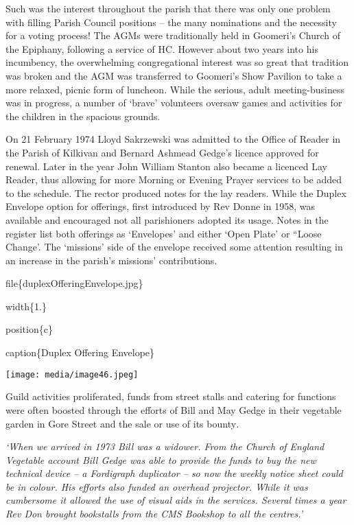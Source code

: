 Such was the interest throughout the parish that there was only one problem with filling Parish Council positions -- the many nominations and the necessity for a voting process! The AGMs were traditionally held in Goomeri's Church of the Epiphany, following a service of HC. However about two years into his incumbency, the overwhelming congregational interest was so great that tradition was broken and the AGM was transferred to Goomeri's Show Pavilion to take a more relaxed, picnic form of luncheon. While the serious, adult meeting-business was in progress, a number of `brave' volunteers oversaw games and activities for the children in the spacious grounds.

On 21 February 1974 Lloyd Sakrzewski was admitted to the Office of Reader in the Parish of Kilkivan and Bernard Ashmead Gedge's licence approved for renewal. Later in the year John William Stanton also became a licenced Lay Reader, thus allowing for more Morning or Evening Prayer services to be added to the schedule. The rector produced notes for the lay readers. While the Duplex Envelope option for offerings, first introduced by Rev Donne in 1958, was available and encouraged not all parishioners adopted its usage. Notes in the register list both offerings as `Envelopes' and either `Open Plate' or ``Loose Change'. The `missions' side of the envelope received some attention resulting in an increase in the parish's missions' contributions.

file\{duplexOfferingEnvelope.jpg\}

width\{1.\}

position\{c\}

caption\{Duplex Offering Envelope\}

\texttt{[image: media/image46.jpeg]}

Guild activities proliferated, funds from street stalls and catering for functions were often boosted through the efforts of Bill and May Gedge in their vegetable garden in Gore Street and the sale or use of its bounty\emph{.}

\emph{`When we arrived in 1973 Bill was a widower. From the Church of England Vegetable account Bill Gedge was able to provide the funds to buy the new technical device -- a Fordigraph duplicator -- so now the weekly notice sheet could be in colour. His efforts also funded an overhead projector. While it was cumbersome it allowed the use of visual aids in the services. Several times a year Rev Don brought bookstalls from the CMS Bookshop to all the centres.'}

